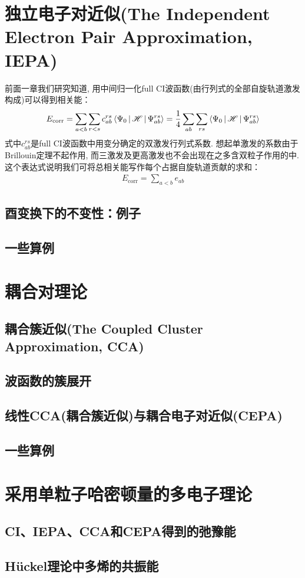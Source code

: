 \section{独立电子对近似(The Independent Electron Pair Approximation, IEPA)}
前面一章我们研究知道, 用中间归一化full CI波函数(由\hft 行列式的全部自旋轨道激发构成)可以得到相关能：
\begin{align}
E_\mathrm{corr} = \sum_{a<b}\sum_{r<s}c_{ab}^{rs}\Braket{\Psi_0|\mathscr{H}|\Psi_{ab}^{rs}} = \frac{1}{4}\sum_{ab}\sum_{rs}\Braket{\Psi_0|\mathscr{H}|\Psi_{ab}^{rs}}
\end{align}
式中$c_{ab}^{rs}$是full CI波函数中用变分确定的双激发行列式系数. 想起单激发的系数由于Brillouin定理不起作用, 而三激发及更高激发也不会出现在之多含双粒子作用的\ha 中. 这个表达式说明我们可将总相关能写作每个占据自旋轨道贡献的求和：
\begin{align}
E_\mathrm{corr} = \sum_{a<b}e_{ab}
\end{align}
\subsection{酉变换下的不变性：例子}
\subsection{一些算例}

\section{耦合对理论}
\subsection{耦合簇近似(The Coupled Cluster Approximation, CCA)}
\subsection{波函数的簇展开}
\subsection{线性CCA(耦合簇近似)与耦合电子对近似(CEPA)}
\subsection{一些算例}

\section{采用单粒子哈密顿量的多电子理论}
\subsection{CI、IEPA、CCA和CEPA得到的弛豫能}
\subsection{H\"uckel理论中多烯的共振能}